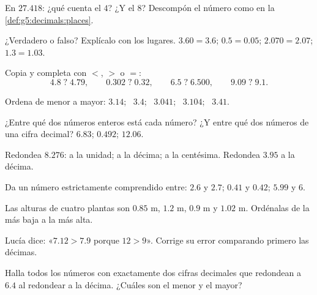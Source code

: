 \begin{exercise}[$\star$]\label{exo:g5:decimals:2}
En $27.418$: ¿qué cuenta el $4$? ¿Y el $8$? Descompón el número
como en la \cref{def:g5:decimals:places}.
\end{exercise}

\begin{exercise}[$\star$]\label{exo:g5:decimals:3}
¿Verdadero o falso? Explícalo con los lugares.
$3.60 = 3.6$; \quad $0.5 = 0.05$; \quad $2.070 = 2.07$; \quad
$1.3 = 1.03$.
\end{exercise}

\begin{exercise}[$\star$]\label{exo:g5:decimals:4}
Copia y completa con $<$, $>$ o $=$:
\[
4.8 \;?\; 4.79, \qquad
0.302 \;?\; 0.32, \qquad
6.5 \;?\; 6.500, \qquad
9.09 \;?\; 9.1 .
\]
\end{exercise}

\begin{exercise}[$\star$]\label{exo:g5:decimals:5}
Ordena de menor a mayor: $3.14$; \ $3.4$; \ $3.041$; \
$3.104$; \ $3.41$.
\end{exercise}

\begin{exercise}[$\star$]\label{exo:g5:decimals:6}
¿Entre qué dos números enteros está cada número? ¿Y entre qué
dos números de una cifra decimal? \quad $6.83$; \quad $0.492$; \quad
$12.06$.
\end{exercise}

\begin{exercise}[$\star$]\label{exo:g5:decimals:7}
Redondea $8.276$: a la unidad; a la décima; a la centésima. Redondea
$3.95$ a la décima.
\end{exercise}

\begin{exercise}[$\star$]\label{exo:g5:decimals:8}
Da un número estrictamente comprendido entre: $2.6$ y $2.7$; \quad $0.41$ y
$0.42$; \quad $5.99$ y $6$.
\end{exercise}

\begin{exercise}[$\star$]\label{exo:g5:decimals:9}
Las alturas de cuatro plantas son $0.85$ m, $1.2$ m, $0.9$ m y
$1.02$ m. Ordénalas de la más baja a la más alta.
\end{exercise}

\begin{exercise}[$\star\star$]\label{exo:g5:decimals:10}
Lucía dice: «$7.12 > 7.9$ porque $12 > 9$». Corrige su error
comparando primero las décimas.
\end{exercise}

\begin{exercise}[$\star\star$]\label{exo:g5:decimals:11}
Halla todos los números con exactamente dos cifras decimales que redondean a
$6.4$ al redondear a la décima. ¿Cuáles son el menor y el
mayor?
\end{exercise}
